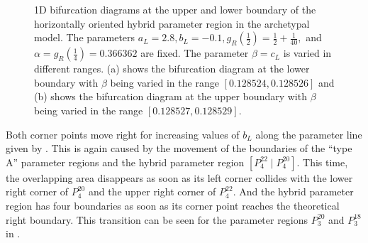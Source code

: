 \begin{figure}
	\centering
	\caption[1D bifurcation diagrams at the upper and lower boundary of the horizontally oriented hybrid parameter region in the archetypal model]{
		1D bifurcation diagrams at the upper and lower boundary of the horizontally oriented hybrid parameter region in the archetypal model.
		The parameters $a_L = 2.8, b_L = -0.1, g_R\left(\frac{1}{2}\right) = \frac{1}{2} + \frac{1}{40},$ and $\alpha = g_R\left(\frac{1}{4}\right) = 0.366362$ are fixed.
		The parameter $\beta = c_L$ is varied in different ranges.
		(a) shows the bifurcation diagram at the lower boundary with $\beta$ being varied in the range $[0.128524, 0.128526]$
		and (b) shows the bifurcation diagram at the upper boundary with $\beta$ being varied in the range $[0.128527, 0.128529]$.
	}
	\label{fig:add.change.appa.hor.bif}
\end{figure}

Both corner points move right for increasing values of $b_L$ along the parameter line given by .
This is again caused by the movement of the boundaries of the ``type A'' parameter regions and the hybrid parameter region $\left[P^{22}_4 \mid P^{20}_4\right]$.
This time, the overlapping area disappears as soon as its left corner collides with the lower right corner of $P^{20}_4$ and the upper right corner of $P^{22}_4$.
And the hybrid parameter region has four boundaries as soon as its corner point reaches the theoretical right boundary.
This transition can be seen for the parameter regions $P^{20}_3$ and $P^{18}_3$ in .

